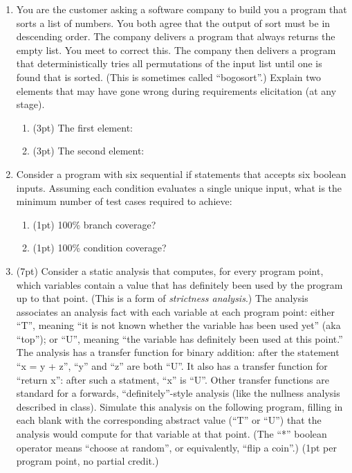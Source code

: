 \documentclass{report}
\newif\ifkey
\newcommand{\answershort}[1]{\ifkey\color{red}\underline{\textbf{#1}}\color{black}\else\underline{\hspace{3in}}\fi\xspace}
\newcommand{\answerlong}[1]{\ifkey\color{red}\textbf{#1}\color{black}\else\vspace{0.5in}\fi\xspace}
\newcommand*{\pts}[1]{\addtocounter{points}{#1}(#1pt)}
\begin{document}
\begin{spacing}{1.4}
\begin{enumerate}[leftmargin=*]
\item You are the customer asking a software company to build you a program that
  sorts a list of numbers. You both agree that the output of sort must be in descending order.
  The company delivers a program that always returns the empty list. You meet to correct
  this. The company then delivers a program that deterministically tries all permutations
  of the input list until one is found that is sorted. (This is sometimes called “bogosort”.)
  Explain two elements that may have gone wrong during requirements
  elicitation (at any stage).
  \begin{enumerate}
  \item \pts{3} The first element:\\
    \answerlong{There was an omission in the functional requirements: the customer failed to state that
      the returned list must have the same elements as the input list.}
  \item \pts{3} The second element:\\
    \answerlong{Quality requirements were not discussed: bogosort is O(n!), which is much slower than
      sorting a list ought to be (O(nlogn)). Other well-reasoned answers are also possible.}
    \end{enumerate}

\item Consider a program with six sequential if statements that accepts six boolean
inputs. Assuming each condition evaluates a single unique input, what is the minimum
number of test cases required to achieve:
\begin{enumerate}
\item \pts{1} 100\% branch coverage? \answershort{2: one that causes each branch to evaluate to false, and another that causes each branch to evaluate to true}
\item \pts{1} 100\% condition coverage? \answershort{12 = 2*6}
\end{enumerate}

\item \pts{7} Consider a static analysis that computes, for every program point, which variables contain a value that has
  definitely been used by the program up to that point. (This is a form of \emph{strictness analysis}.) The analysis
  associates an analysis fact with each variable at each program point: either ``T'', meaning ``it is not known whether the
  variable has been used yet'' (aka ``top''); or ``U'', meaning ``the variable has definitely been used at this point.'' The analysis has
  a transfer function for binary addition: after the statement ``x = y + z'', ``y'' and ``z'' are both ``U''. It also has a
  transfer function for ``return x'': after such a statment, ``x'' is ``U''. Other transfer functions are standard for a forwards,
  ``definitely''-style analysis (like the nullness analysis described in class).
  Simulate this analysis on the following program, filling in each blank with the corresponding abstract value (``T'' or ``U'')
  that the analysis would compute for that variable at that point. (The ``*'' boolean operator means ``choose at random'', or equivalently, ``flip a coin''.)
  (1pt per program point, no partial credit.)


\end{enumerate}
\end{spacing}
\end{document}
